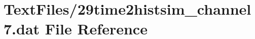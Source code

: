 \hypertarget{29time2histsim__channel7_8dat}{}\section{Text\+Files/29time2histsim\+\_\+channel7.dat File Reference}
\label{29time2histsim__channel7_8dat}
